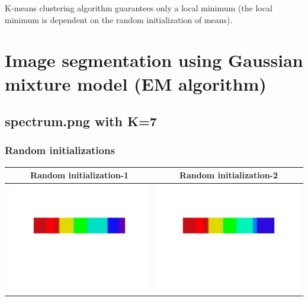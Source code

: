 \documentclass[fleqn]{article}
\begin{document}
K-means clustering algorithm guarantees only a local minimum (the local minimum is dependent on the random initialization of means).\\

\newpage
\section{Image segmentation using Gaussian mixture model (EM algorithm)}

\subsection{spectrum.png with K=7}
\subsubsection{Random initializations}
\begin{center}
  \begin{longtable}{ c | c }
	\multicolumn{1}{c}{Random initialization-1} & 
	\multicolumn{1}{c}{Random initialization-2}  \\
    \hline
    \includegraphics[scale=0.4]{./pics/task1and2/EM_K=7_spectrum_random1.png}  & \includegraphics[scale=0.4]{./pics/task1and2/EM_K=7_spectrum_random2.png} \\
    \hline
  \end{longtable}
\end{center}
\end{document}
